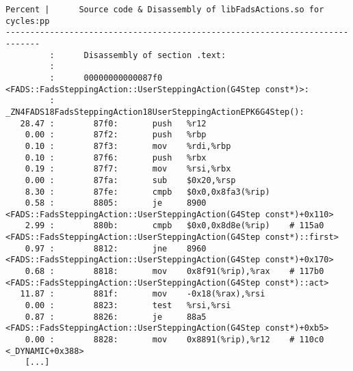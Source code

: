 \documentclass[a4paper]{jpconf}
\begin{document}
\begin{appendices}
\begin{minipage}{\linewidth}
\begin{lstlisting}[language={[x64]Assembler}, basicstyle=\ttfamily\tiny,
caption=FADS::FadsSteppingAction::UserSteppingAction cycles annotation]
Percent |      Source code & Disassembly of libFadsActions.so for  cycles:pp
-----------------------------------------------------------------------------
         :      Disassembly of section .text:
         :
         :      00000000000087f0 <FADS::FadsSteppingAction::UserSteppingAction(G4Step const*)>:
         :      _ZN4FADS18FadsSteppingAction18UserSteppingActionEPK6G4Step():
   28.47 :        87f0:       push   %r12
    0.00 :        87f2:       push   %rbp
    0.10 :        87f3:       mov    %rdi,%rbp
    0.10 :        87f6:       push   %rbx
    0.19 :        87f7:       mov    %rsi,%rbx
    0.00 :        87fa:       sub    $0x20,%rsp
    8.30 :        87fe:       cmpb   $0x0,0x8fa3(%rip)
    0.58 :        8805:       je     8900 <FADS::FadsSteppingAction::UserSteppingAction(G4Step const*)+0x110>
    2.99 :        880b:       cmpb   $0x0,0x8d8e(%rip)    # 115a0 <FADS::FadsSteppingAction::UserSteppingAction(G4Step const*)::first>
    0.97 :        8812:       jne    8960 <FADS::FadsSteppingAction::UserSteppingAction(G4Step const*)+0x170>
    0.68 :        8818:       mov    0x8f91(%rip),%rax    # 117b0 <FADS::FadsSteppingAction::UserSteppingAction(G4Step const*)::act>
   11.87 :        881f:       mov    -0x18(%rax),%rsi
    0.00 :        8823:       test   %rsi,%rsi
    0.87 :        8826:       je     88a5 <FADS::FadsSteppingAction::UserSteppingAction(G4Step const*)+0xb5>
    0.00 :        8828:       mov    0x8891(%rip),%r12    # 110c0 <_DYNAMIC+0x388>
    [...]
\end{lstlisting}
\end{minipage}


\end{appendices}
\end{document}
